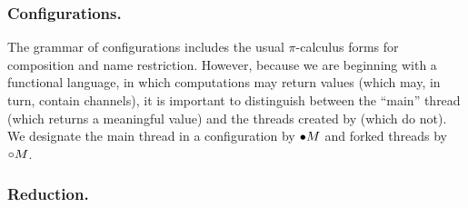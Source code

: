 \documentclass[oribibl,orivec,envcountsame]{llncs}
\begin{document}

\subsubsection{Configurations.}

The grammar of configurations includes the usual $\pi$-calculus forms for composition and name
restriction.  However, because we are beginning with a functional language, in which computations
may return values (which may, in turn, contain channels), it is important to distinguish between the
``main'' thread (which returns a meaningful value) and the threads created by  (which
do not).  We designate the main thread in a configuration by ${\mathord{\bullet}} M$ and forked threads by
${\mathord{\circ}} M$.

\subsubsection{Reduction.}
\end{document}
